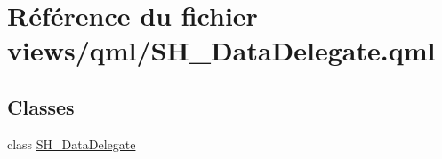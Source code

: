 \hypertarget{SH__DataDelegate_8qml}{\section{Référence du fichier views/qml/\-S\-H\-\_\-\-Data\-Delegate.qml}
\label{SH__DataDelegate_8qml}
}
\subsection*{Classes}
\begin{DoxyCompactItemize}
\item 
class \hyperlink{classSH__DataDelegate}{S\-H\-\_\-\-Data\-Delegate}
\end{DoxyCompactItemize}
